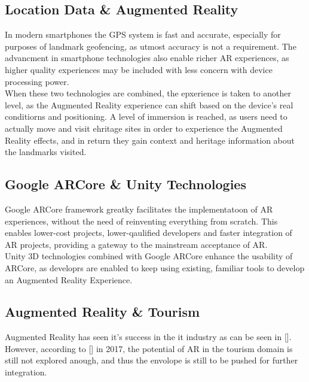 \subsection{Location Data \&  Augmented Reality}
In modern smartphones the GPS system is fast and accurate, especially for purposes of landmark geofencing, 
as utmost accuracy is not a requirement. The advancment in smartphone technologies also enable richer AR experiences, as higher quality 
experiences may be included with less concern with device processing power.\\
When these two technologies are combined, the epxerience is taken to another level, as the Augmented Reality experience can shift based on 
the device's real conditiorns and positioning. A level of immersion is reached, as users need to actually move and visit ehritage sites in 
order to experience the Augmented Reality effects, and in return they gain context and heritage information about the landmarks visited.   
\subsection{Google ARCore \& Unity Technologies}
Google ARCore framework greatky facilitates the implementatoon of AR experiences, without the need of reinventing everything from scratch. 
This enables lower-cost projects, lower-qaulified developers and faster integration of AR projects, 
providing a gateway to the mainstream acceptance of AR.\\
Unity 3D technologies combined with Google ARCore enhance the usability of ARCore, as developrs are enabled to keep using existing, 
familiar tools to develop an Augmented Reality Experience. 
\subsection{Augmented Reality \& Tourism}
Augmented Reality has seen it's success in the it industry as can be seen in []. However, according to [] in 2017, the potential of AR
in the tourism domain is still not explored anough, and thus the envolope is still to be pushed for further integration.